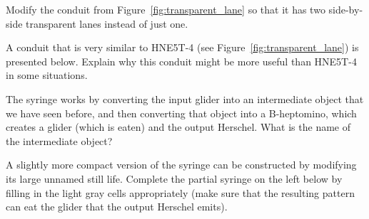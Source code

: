 \begin{multicols}{2}
	
	\mfilbreak
	
	
	\begin{problemstar}\label{exer:two_transparent_lanes} 
		Modify the conduit from Figure~\ref{fig:transparent_lane} so that it has two side-by-side transparent lanes instead of just one.
		
	\end{problemstar}
	
	
	\mfilbreak
	
	
	\begin{problemstar}\label{exer:H_to_G_transparent_better} 
		A conduit that is very similar to HNE5T-4 (see Figure~\ref{fig:transparent_lane}) is presented below. Explain why this conduit might be more useful than HNE5T-4 in some situations.
		
		\begin{center}
		\end{center}
	\end{problemstar}
	
	
	\mfilbreak
	
	
	\begin{problemstar}\label{exer:syringe_creates_pi} 
		The syringe works by converting the input glider into an intermediate object that we have seen before, and then converting that object into a B-heptomino, which creates a glider (which is eaten) and the output Herschel. What is the name of the intermediate object?
	\end{problemstar}
	
	
	\mfilbreak
	
	\begin{problemstar}\label{exer:syringe_compact} 
		A slightly more compact version of the syringe can be constructed by modifying its large unnamed still life. Complete the partial syringe on the left below by filling in the light gray cells appropriately (make sure that the resulting pattern can eat the glider that the output Herschel emits).
		
		\begin{center}
			~\quad~
		\end{center}
		
	\end{problemstar}
	

\end{multicols}
